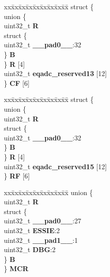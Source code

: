 \begin{DoxyCompactItemize}
\begin{tabbing}
\end{tabbing}\item 
\mbox{\label{structEQADC__tag_a0d18e506731d24bff8ffa9c35575296d}} 
\begin{tabbing}
xx\=xx\=xx\=xx\=xx\=xx\=xx\=xx\=xx\=\kill
struct \{\\
\>union \{\\
\>\>uint32\_t {\bfseries R}\\
\>\>struct \{\\
\>\>\>uint32\_t {\bfseries \_\_pad0\_\_}:32\\
\>\>\} {\bfseries B}\\
\>\} {\bfseries R} \mbox{[}4\mbox{]}\\
\>uint32\_t {\bfseries eqadc\_reserved13} \mbox{[}12\mbox{]}\\
\} {\bfseries CF} \mbox{[}6\mbox{]}\\

\end{tabbing}\item 
\mbox{\label{structEQADC__tag_a433171e682f492761e81ac19f7513c46}} 
\begin{tabbing}
xx\=xx\=xx\=xx\=xx\=xx\=xx\=xx\=xx\=\kill
struct \{\\
\>union \{\\
\>\>uint32\_t {\bfseries R}\\
\>\>struct \{\\
\>\>\>uint32\_t {\bfseries \_\_pad0\_\_}:32\\
\>\>\} {\bfseries B}\\
\>\} {\bfseries R} \mbox{[}4\mbox{]}\\
\>uint32\_t {\bfseries eqadc\_reserved15} \mbox{[}12\mbox{]}\\
\} {\bfseries RF} \mbox{[}6\mbox{]}\\

\end{tabbing}\item 
\mbox{\label{structEQADC__tag_a4c517837e632128df65f8a880c5c29f5}} 
\begin{tabbing}
xx\=xx\=xx\=xx\=xx\=xx\=xx\=xx\=xx\=\kill
union \{\\
\>uint32\_t {\bfseries R}\\
\>struct \{\\
\>\>uint32\_t {\bfseries \_\_pad0\_\_}:27\\
\>\>uint32\_t {\bfseries ESSIE}:2\\
\>\>uint32\_t {\bfseries \_\_pad1\_\_}:1\\
\>\>uint32\_t {\bfseries DBG}:2\\
\>\} {\bfseries B}\\
\} {\bfseries MCR}\\


\end{tabbing}
\end{DoxyCompactItemize}
